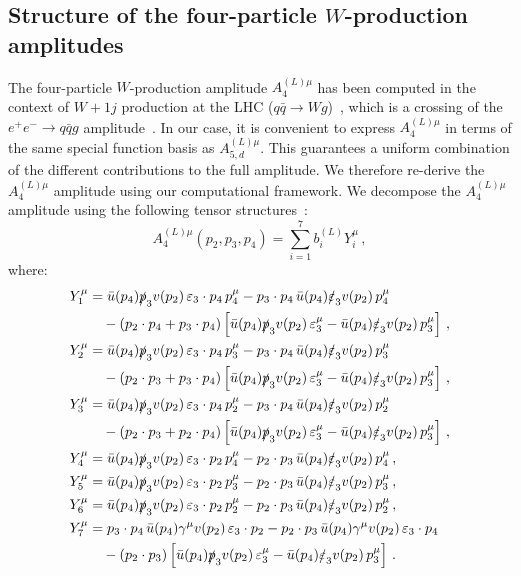\documentclass[main.tex]{subfiles}
\begin{document}
\subsection{Structure of the four-particle $W$-production amplitudes}
\label{wyjsec:B4amplitude}

The four-particle $W$-production amplitude $A_{4}^{(L)\mu}$ has been computed in the context of $W+1j$ production at the LHC ($q\bar{q} \to Wg$)~\cite{Gehrmann:2011ab}, which is a crossing of the $e^+ e^- \to q\bar{q}g$ amplitude~\cite{Garland:2002ak}. In our case, it is convenient to express $A_{4}^{(L)\mu}$ in terms of the same special function basis as $A_{5,d}^{(L)\mu}$. This guarantees a uniform combination of the different contributions to the full amplitude. We therefore re-derive the $A_{4}^{(L)\mu}$ amplitude using our computational framework. We decompose the $A_{4}^{(L)\mu}$ amplitude using the following tensor structures~\cite{Garland:2002ak}:
\begin{equation}
A_{4}^{(L)\mu}(p_2,p_3,p_4) = \sum_{i=1}^{7} b_i^{(L)} Y_{i}^\mu \,,
\label{Wyjeq:B4decomposition}
\end{equation}
where:
\begin{align}
  Y_{1}^{\mu}  &= \bar{u}(p_4) \slashed{p}_3 v(p_2) \, \varepsilon_3 \cdot p_4 \, p_4^\mu 
                    -p_3 \cdot p_4 \, \bar{u}(p_4) \slashed{\varepsilon}_3 v(p_2) \, p_4^\mu \nonumber \\ 
                 & \quad -(p_2 \cdot p_4 + p_3 \cdot p_4) \left[\bar{u}(p_4) \slashed{p}_3 v(p_2) \, \varepsilon_3^\mu - \bar{u}(p_4) \slashed{\varepsilon}_3 v(p_2) \, p_3^\mu \right] \,, \nonumber \\ 
  Y_{2}^{\mu}  &= \bar{u}(p_4) \slashed{p}_3 v(p_2) \, \varepsilon_3 \cdot p_4 \, p_3^\mu 
                    -p_3 \cdot p_4 \, \bar{u}(p_4) \slashed{\varepsilon}_3 v(p_2) \, p_3^\mu \nonumber \\ 
                 & \quad -(p_2 \cdot p_3 + p_3 \cdot p_4) \left[\bar{u}(p_4) \slashed{p}_3 v(p_2) \, \varepsilon_3^\mu - \bar{u}(p_4) \slashed{\varepsilon}_3 v(p_2) \, p_3^\mu \right] \,, \nonumber \\ 
  Y_{3}^{\mu}  &= \bar{u}(p_4) \slashed{p}_3 v(p_2) \, \varepsilon_3 \cdot p_4 \, p_2^\mu 
                    -p_3 \cdot p_4 \, \bar{u}(p_4) \slashed{\varepsilon}_3 v(p_2) \, p_2^\mu \nonumber \\ 
                 & \quad -(p_2 \cdot p_3 + p_2 \cdot p_4) \left[\bar{u}(p_4) \slashed{p}_3 v(p_2) \, \varepsilon_3^\mu - \bar{u}(p_4) \slashed{\varepsilon}_3 v(p_2) \, p_3^\mu \right] \,, \label{Wyjeq:4ptDecomposition}\\
  Y_{4}^{\mu}  &= \bar{u}(p_4) \slashed{p}_3 v(p_2) \, \varepsilon_3 \cdot p_2 \, p_4^\mu 
                    -p_2 \cdot p_3 \, \bar{u}(p_4) \slashed{\varepsilon}_3 v(p_2) \, p_4^\mu \,, \nonumber \\ 
  Y_{5}^{\mu}  &= \bar{u}(p_4) \slashed{p}_3 v(p_2) \, \varepsilon_3 \cdot p_2 \, p_3^\mu 
                    -p_2 \cdot p_3 \, \bar{u}(p_4) \slashed{\varepsilon}_3 v(p_2) \, p_3^\mu \,, \nonumber \\ 
  Y_{6}^{\mu}  &= \bar{u}(p_4) \slashed{p}_3 v(p_2) \, \varepsilon_3 \cdot p_2 \, p_2^\mu 
                    -p_2 \cdot p_3 \, \bar{u}(p_4) \slashed{\varepsilon}_3 v(p_2) \, p_2^\mu \,, \nonumber \\ 
  Y_{7}^{\mu}  &=   p_3 \cdot p_4 \, \bar{u}(p_4) \gamma^\mu v(p_2) \, \varepsilon_3 \cdot p_2
                    - p_2 \cdot p_3 \, \bar{u}(p_4) \gamma^\mu v(p_2) \, \varepsilon_3 \cdot p_4 \nonumber \\ 
                 & \quad -(p_2 \cdot p_3) \left[ \bar{u}(p_4) \slashed{p}_3 v(p_2) \, \varepsilon_3^\mu  - \bar{u}(p_4) \slashed{\varepsilon}_3 v(p_2) \, p_3^\mu \right] \,. \nonumber
\end{align}
\end{document}
